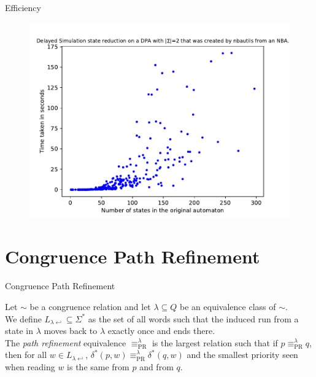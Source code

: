 \begin{frame}{Efficiency}
\begin{figure}
	\centering
	\includegraphics[page=6,height=.8\textheight]{../data/analysis/fritzwilke/detnbaut_ap1.pdf} 
\end{figure}
\end{frame}




\section{Congruence Path Refinement}
\begin{frame}{Congruence Path Refinement}
	\begin{defn}
	Let $\sim$ be a congruence relation and let $\lambda \subseteq Q$ be an equivalence class of $\sim$. \\
	We define $L_{\lambda \hookleftarrow} \subseteq \Sigma^*$ as the set of all words such that the induced run from a state in $\lambda$ moves back to $\lambda$ exactly once and ends there. \\ 
	The \emph{path refinement} equivalence $\equiv_\text{PR}^\lambda$ is the largest relation such that if $p \equiv_\text{PR}^\lambda q$, then for all $w \in L_{\lambda \hookleftarrow}$, $\delta^*(p, w) \equiv_\text{PR}^\lambda \delta^*(q, w)$ and the smallest priority seen when reading $w$ is the same from $p$ and from $q$.
	\end{defn}
\end{frame}



